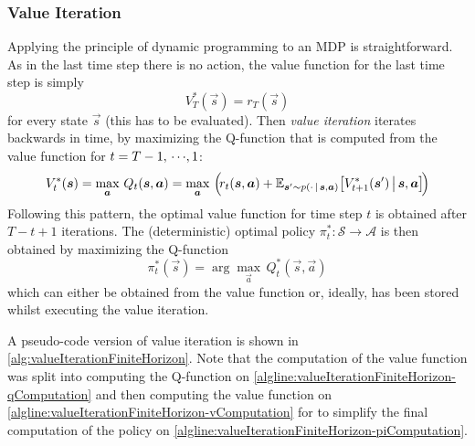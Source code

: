 			\subsubsection{Value Iteration}
				Applying the principle of dynamic programming to an MDP is straightforward. As in the last time step there is no action, the value function for the last time step is simply
				\begin{equation*}
					V_T^\ast(\vec{s}) = r_T(\vec{s})
				\end{equation*}
				for every state \(\vec{s}\) (this has to be evaluated). Then \emph{value iteration} iterates backwards in time, by maximizing the Q-function that is computed from the value function for \( t = T - 1,\,\cdots\!,1 \):
				\begin{equation*}
					V_t^\ast(\bm{s}) = \max_{\bm{a}} \, Q_t(\bm{s}, \bm{a}) = \max_{\bm{a}} \, \Big(\! r_t(\bm{s}, \bm{a}) + \mathbb{E}_{\bm{s}' \sim p(\cdot \,\vert\, \bm{s}, \bm{a})}\big[ V_{t + 1}^\ast(\bm{s}') \,\big\vert\, \bm{s}, \bm{a} \big] \!\Big)
				\end{equation*}
				Following this pattern, the optimal value function for time step \(t\) is obtained after \( T - t + 1 \) iterations. The (deterministic) optimal policy \( \pi_t^\ast : \mathcal{S} \to \mathcal{A} \) is then obtained by maximizing the Q-function
				\begin{equation*}
					\pi_t^\ast(\vec{s}) = \arg\max_{\vec{a}} \, Q_t^\ast(\vec{s}, \vec{a})
				\end{equation*}
				which can either be obtained from the value function or, ideally, has been stored whilst executing the value iteration.

				A pseudo-code version of value iteration is shown in \autoref{alg:valueIterationFiniteHorizon}. Note that the computation of the value function was split into computing the Q-function on \autoref{algline:valueIterationFiniteHorizon-qComputation} and then computing the value function on \autoref{algline:valueIterationFiniteHorizon-vComputation} for to simplify the final computation of the policy on \autoref{algline:valueIterationFiniteHorizon-piComputation}.

